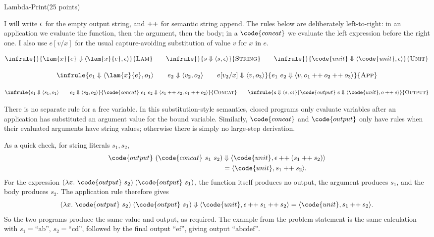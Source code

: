 \documentclass{article}
\begin{document}
%
%
%

\newpage

\begin{question}{Lambda-Print}{(25 points)}

I will write \(\epsilon\) for the empty output string, and
\(\mathbin{++}\) for semantic string append. The rules below are deliberately
left-to-right: in an application we evaluate the function, then the argument,
then the body; in a \(\code{concat}\) we evaluate the left expression before
the right one. I also use \(e[v/x]\) for the usual capture-avoiding
substitution of value \(v\) for \(x\) in \(e\).

\[
\infrule
  {}
  {\lam{x}{e} \Downarrow \langle \lam{x}{e},\emptyout\rangle}
  {\textsc{Lam}}
\qquad
\infrule
  {}
  {s \Downarrow \langle s,\emptyout\rangle}
  {\textsc{String}}
\qquad
\infrule
  {}
  {\code{unit} \Downarrow \langle \code{unit},\emptyout\rangle}
  {\textsc{Unit}}
\]

\[
\infrule
  {e_1 \Downarrow \langle \lam{x}{e},o_1\rangle
   \qquad
   e_2 \Downarrow \langle v_2,o_2\rangle
   \qquad
   e[v_2/x] \Downarrow \langle v,o_3\rangle}
  {e_1~e_2 \Downarrow \langle v,o_1\sappend o_2\sappend o_3\rangle}
  {\textsc{App}}
\]

\[
\infrule
  {e_1 \Downarrow \langle s_1,o_1\rangle
   \qquad
   e_2 \Downarrow \langle s_2,o_2\rangle}
  {\code{concat}\ e_1\ e_2
   \Downarrow
   \langle s_1\sappend s_2,o_1\sappend o_2\rangle}
  {\textsc{Concat}}
\qquad
\infrule
  {e \Downarrow \langle s,o\rangle}
  {\code{output}\ e
   \Downarrow
   \langle \code{unit},o\sappend s\rangle}
  {\textsc{Output}}
\]

There is no separate rule for a free variable. In this substitution-style
semantics, closed programs only evaluate variables after an application has
substituted an argument value for the bound variable. Similarly,
\(\code{concat}\) and \(\code{output}\) only have rules when their evaluated
arguments have string values; otherwise there is simply no large-step
derivation.

\medskip
\noindent
As a quick check, for string literals \(s_1,s_2\),
\[
\begin{aligned}
  \code{output}\ (\code{concat}\ s_1\ s_2)
  &\Downarrow
    \langle \code{unit},\emptyout\sappend(s_1\sappend s_2)\rangle \\
  &= \langle \code{unit},s_1\sappend s_2\rangle.
\end{aligned}
\]
For the expression \((\lambda x.\ \code{output}\ s_2)\;(\code{output}\ s_1)\),
the function itself produces no output, the argument produces \(s_1\), and
the body produces \(s_2\). The application rule therefore gives
\[
  (\lambda x.\ \code{output}\ s_2)\;(\code{output}\ s_1)
  \Downarrow
  \langle \code{unit},\emptyout\sappend s_1\sappend s_2\rangle
  =
  \langle \code{unit},s_1\sappend s_2\rangle.
\]
So the two programs produce the same value and output, as required. The
example from the problem statement is the same calculation with
\(s_1=\text{``ab''}\), \(s_2=\text{``cd''}\), followed by the final output
\(\text{``ef''}\), giving output \(\text{``abcdef''}\).

\end{question}
\end{document}
